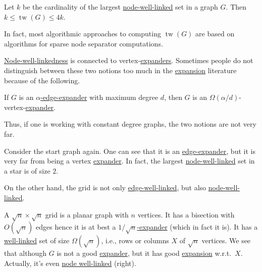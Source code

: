 \begin{theorem}\label{thm:node-well-linked-treewidth}
	Let \(k\) be the cardinality of the largest \hyperref[def:node-well-linked]{node-well-linked} set in a graph \(G\). Then \(k \leq \operatorname{tw}(G) \leq 4k\).
\end{theorem}

\begin{remark}
	In fact, most algorithmic approaches to computing \(\operatorname{tw}(G) \) are based on algorithms for sparse node separator computations.
\end{remark}

\hyperref[def:node-well-linked]{Node-well-linkedness} is connected to vertex-\hyperref[def:expander]{expanders}. Sometimes people do not distinguish between these two notions too much in the \hyperref[def:expansion]{expansion} literature because of the following.

\begin{claim}
	If \(G\) is an \hyperref[def:expander]{\(\alpha \)-edge-expander} with maximum degree \(d\), then \(G\) is an \(\Omega (\alpha / d)\)-vertex-\hyperref[def:expander]{expander}.
\end{claim}

Thus, if one is working with constant degree graphs, the two notions are not very far.

\begin{eg}[Star]
	Consider the start graph again. One can see that it is an \hyperref[def:expander]{edge-expander}, but it is very far from being a vertex \hyperref[def:expander]{expander}. In fact, the largest \hyperref[def:node-well-linked]{node-well-linked} set in a star is of size \(2\).
\end{eg}

On the other hand, the grid is not only  \hyperref[def:well-linked]{edge-well-linked}, but also \hyperref[def:node-well-linked]{node-well-linked}.

\begin{eg}[Grid]
	A \(\sqrt{n} \times \sqrt{n} \) grid is a planar graph with \(n\) vertices. It has a bisection with \(O(\sqrt{n} )\) edges hence it is at best a \hyperref[def:expander]{\(1 / \sqrt{n} \)-expander} (which in fact it is). It has a \hyperref[def:fractional-well-linked]{well-linked} set of size \(\Omega (\sqrt{n} )\), i.e., rows or columns \(X\) of \(\sqrt{n} \) vertices. We see that although \(G\) is not a good \hyperref[def:expander]{expander}, but it has good \hyperref[def:expansion]{expansion} w.r.t.\ \(X\). Actually, it's even \hyperref[def:node-linkage]{node well-linked} (right).
	\begin{center}
	\end{center}
\end{eg}

